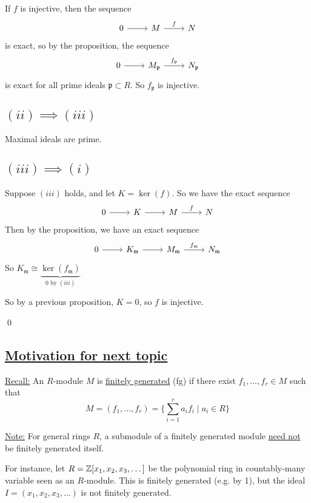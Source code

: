 \documentclass[x11names,reqno,14pt]{extarticle}
\newcommand{\mk}[1]{\mathfrak{#1}}
\begin{document}
If $f$ is injective, then the sequence
\[
\begin{tikzcd}
0\ar[r]&M\ar[r, "f"]& N 
\end{tikzcd}
\]
is exact, so by the proposition, the sequence
\[
\begin{tikzcd}
0\ar[r]&M_\mk{p}\ar[r, "f_\mk{p}"]&N_\mk{p}
\end{tikzcd}
\]
is exact for all prime ideals $\mk{p}\subset R$. So $f_\mk{p}$ is injective. 

\subsection*{$(ii)\implies(iii)$}

Maximal ideals are prime. 

\subsection*{$(iii)\implies(i)$}

Suppose $(iii)$ holds, and let $K = \ker(f)$. So we have the exact sequence
\[
\begin{tikzcd}
0\ar[r]&K\ar[r]&M\ar[r, "f"]&N 
\end{tikzcd}
\]
Then by the proposition, we have an exact sequence
\[
\begin{tikzcd}
0\ar[r]&K_\mk{m}\ar[r]&M_\mk{m}\ar[r, "f_\mk{m}"] & N_\mk{m} 
\end{tikzcd}
\]
So $K_\mk{m} \cong \underbrace{\ker(f_\mk{m})}_{0\text{ by }(iii)}$

So by a previous proposition, $K = 0$, so $f$ is injective. 

\qed

\subsection*{\underline{Motivation for next topic}}

\underline{Recall:} An $R$-module $M$ is \underline{finitely generated} (fg) if there exist $f_1, \dots, f_r \in M$ such that
\[
M = (f_1, \dots, f_r) = \{\sum_{i=1}^ra_if_i\mid a_i\in R\}
\]

\underline{Note:} For general rings $R$, a submodule of a finitely generated module \underline{need not} be finitely generated itself. 

For instance, let $R = \mathbb{Z}[x_1, x_2, x_3, \dots ]$ be the polynomial ring in countably-many variable seen as an $R$-module. This is finitely generated (e.g. by 1), but the ideal $I = (x_1, x_2, x_3, \dots )$ is not finitely generated. 
\end{document}
